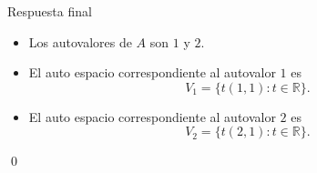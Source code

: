 \documentclass{beamer} %
\newcommand{\R}{\mathbb R}
\begin{document}


\begin{frame}
    \begin{block}{Respuesta final}
        \begin{itemize}
            \item Los autovalores de $A$ son $1$ y $2$.\pause
            \item El auto espacio correspondiente al  autovalor $1$ es
            \begin{equation*}
                V_1 = \{t(1,1): t \in \R\}.
            \end{equation*}\pause
            \item El auto espacio correspondiente al  autovalor $2$ es
            \begin{equation*}
                V_2 = \{t(2,1): t \in \R\}.
            \end{equation*}
        \end{itemize}
\qed\vskip 2cm
        
    \end{block}
\end{frame}
\end{document}
